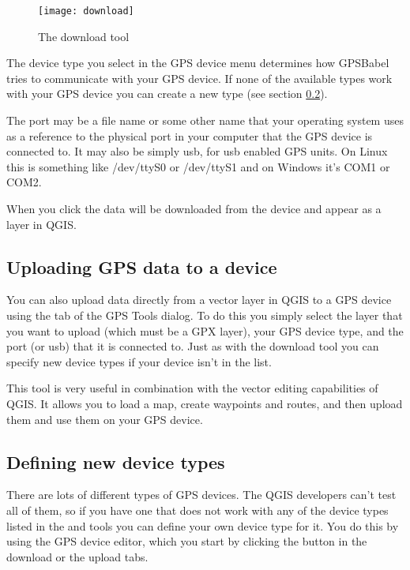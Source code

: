 \begin{figure}[ht]
   \centering
   \texttt{[image: download]}
   \caption{The download tool \nixcaption}\label{figure_download}
\end{figure}

The device type you select in the GPS device menu determines how GPSBabel tries to communicate with your GPS device.
If none of the available types work with your GPS device you can create a new type (see section \ref{sec:Defining-new-device}).

The port may be a file name or some other name that your operating system uses as a reference to the physical port in your computer that the GPS device is connected to. It may also be simply usb, for usb enabled GPS units.
\nix On Linux this is something like /dev/ttyS0 or /dev/ttyS1 and on \win Windows it's COM1 or COM2.

When you click  the data will be downloaded from the device and appear as a layer in QGIS.

\subsection{Uploading GPS data to a device}

You can also upload data directly from a vector layer in QGIS to a GPS device using the  tab of the GPS Tools dialog. To do this you simply select the layer that you want to upload (which must be a GPX layer), 
your GPS device type, and the port (or usb) that it is connected to.
Just as with the download tool you can specify new device types if your device isn't in the list.

This tool is very useful in combination with the vector editing capabilities of QGIS. It allows you to load a map, create waypoints and routes, and then upload them and use them on your GPS device.

\subsection{Defining new device types}\label{sec:Defining-new-device}

There are lots of different types of GPS devices.
The QGIS developers can't test all of them, so if you have one that does not work with any of the device types listed in the  and  tools you can define your own device type for it.
You do this by using the GPS device editor, which you start by clicking the  button in the download or the upload tabs.

